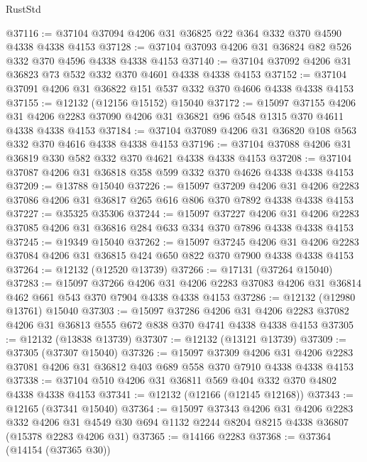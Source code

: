 \begin{lexlean}{RustStd}
\begin{coremodule}
{\begin{coremodule}
{{{{{{{{{{{{{{{{{{{{{{{{{{{{{{{{{{{{{{{{{{{{{{{{{{@37116 := @37104 @37094 @4206 @31 @36825 @22 @364 @332 @370 @4590 @4338 @4338 @4153
@37128 := @37104 @37093 @4206 @31 @36824 @82 @526 @332 @370 @4596 @4338 @4338 @4153
@37140 := @37104 @37092 @4206 @31 @36823 @73 @532 @332 @370 @4601 @4338 @4338 @4153
@37152 := @37104 @37091 @4206 @31 @36822 @151 @537 @332 @370 @4606 @4338 @4338 @4153
@37155 := @12132 (@12156 @15152) @15040
@37172 := @15097
    @37155
    @4206
    @31
    @4206
    @2283
    @37090
    @4206
    @31
    @36821
    @96
    @548
    @1315
    @370
    @4611
    @4338
    @4338
    @4153
@37184 := @37104 @37089 @4206 @31 @36820 @108 @563 @332 @370 @4616 @4338 @4338 @4153
@37196 := @37104 @37088 @4206 @31 @36819 @330 @582 @332 @370 @4621 @4338 @4338 @4153
@37208 := @37104 @37087 @4206 @31 @36818 @358 @599 @332 @370 @4626 @4338 @4338 @4153
@37209 := @13788 @15040
@37226 := @15097
    @37209
    @4206
    @31
    @4206
    @2283
    @37086
    @4206
    @31
    @36817
    @265
    @616
    @806
    @370
    @7892
    @4338
    @4338
    @4153
@37227 := @35325 @35306
@37244 := @15097
    @37227
    @4206
    @31
    @4206
    @2283
    @37085
    @4206
    @31
    @36816
    @284
    @633
    @334
    @370
    @7896
    @4338
    @4338
    @4153
@37245 := @19349 @15040
@37262 := @15097
    @37245
    @4206
    @31
    @4206
    @2283
    @37084
    @4206
    @31
    @36815
    @424
    @650
    @822
    @370
    @7900
    @4338
    @4338
    @4153
@37264 := @12132 (@12520 @13739)
@37266 := @17131 (@37264 @15040)
@37283 := @15097
    @37266
    @4206
    @31
    @4206
    @2283
    @37083
    @4206
    @31
    @36814
    @462
    @661
    @543
    @370
    @7904
    @4338
    @4338
    @4153
@37286 := @12132 (@12980 @13761) @15040
@37303 := @15097
    @37286
    @4206
    @31
    @4206
    @2283
    @37082
    @4206
    @31
    @36813
    @555
    @672
    @838
    @370
    @4741
    @4338
    @4338
    @4153
@37305 := @12132 (@13838 @13739)
@37307 := @12132 (@13121 @13739)
@37309 := @37305 (@37307 @15040)
@37326 := @15097
    @37309
    @4206
    @31
    @4206
    @2283
    @37081
    @4206
    @31
    @36812
    @403
    @689
    @558
    @370
    @7910
    @4338
    @4338
    @4153
@37338 := @37104 @510 @4206 @31 @36811 @569 @404 @332 @370 @4802 @4338 @4338 @4153
@37341 := @12132 (@12166 (@12145 @12168))
@37343 := @12165 (@37341 @15040)
@37364 := @15097
    @37343
    @4206
    @31
    @4206
    @2283
    @332
    @4206
    @31
    @4549
    @30
    @694
    @1132
    @2244
    @8204
    @8215
    @4338
    @36807
    (@15378 @2283 @4206 @31)
@37365 := @14166 @2283
@37368 := @37364 (@14154 (@37365 @30))
}}}}}}}}}}}}}}}}}}}}}}}}}}}}}}}}}}}}}}}}}}}}}}}}}}
\end{coremodule}}
\end{coremodule}
\end{lexlean}
